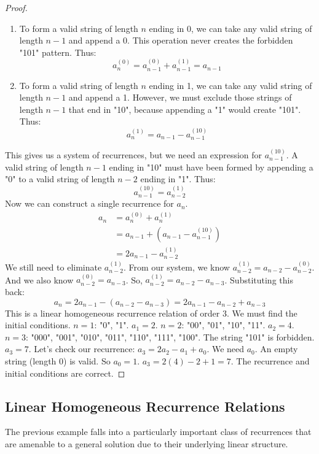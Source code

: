 \begin{proof}
\begin{enumerate}
    \item To form a valid string of length $n$ ending in 0, we can take any valid string of length $n-1$ and append a 0. This operation never creates the forbidden "101" pattern. Thus:
    $$ a_n^{(0)} = a_{n-1}^{(0)} + a_{n-1}^{(1)} = a_{n-1} $$
    \item To form a valid string of length $n$ ending in 1, we can take any valid string of length $n-1$ and append a 1. However, we must exclude those strings of length $n-1$ that end in "10", because appending a "1" would create "101". Thus:
    $$ a_n^{(1)} = a_{n-1} - a_{n-1}^{(10)} $$
\end{enumerate}
This gives us a system of recurrences, but we need an expression for $a_{n-1}^{(10)}$. A valid string of length $n-1$ ending in "10" must have been formed by appending a "0" to a valid string of length $n-2$ ending in "1". Thus:
$$ a_{n-1}^{(10)} = a_{n-2}^{(1)} $$
Now we can construct a single recurrence for $a_n$.
\begin{align*}
a_n &= a_n^{(0)} + a_n^{(1)} \\
&= a_{n-1} + (a_{n-1} - a_{n-1}^{(10)}) \\
&= 2a_{n-1} - a_{n-2}^{(1)}
\end{align*}
We still need to eliminate $a_{n-2}^{(1)}$. From our system, we know $a_{n-2}^{(1)} = a_{n-2} - a_{n-2}^{(0)}$. And we also know $a_{n-2}^{(0)} = a_{n-3}$. So, $a_{n-2}^{(1)} = a_{n-2} - a_{n-3}$. Substituting this back:
$$ a_n = 2a_{n-1} - (a_{n-2} - a_{n-3}) = 2a_{n-1} - a_{n-2} + a_{n-3} $$
This is a linear homogeneous recurrence relation of order 3. We must find the initial conditions.
$n=1$: "0", "1". $a_1=2$.
$n=2$: "00", "01", "10", "11". $a_2=4$.
$n=3$: "000", "001", "010", "011", "110", "111", "100". The string "101" is forbidden. $a_3=7$.
Let's check our recurrence: $a_3 = 2a_2 - a_1 + a_0$. We need $a_0$. An empty string (length 0) is valid. So $a_0 = 1$.
$a_3 = 2(4) - 2 + 1 = 7$. The recurrence and initial conditions are correct.
\end{proof}

\subsection{Linear Homogeneous Recurrence Relations}

The previous example falls into a particularly important class of recurrences that are amenable to a general solution due to their underlying linear structure.

